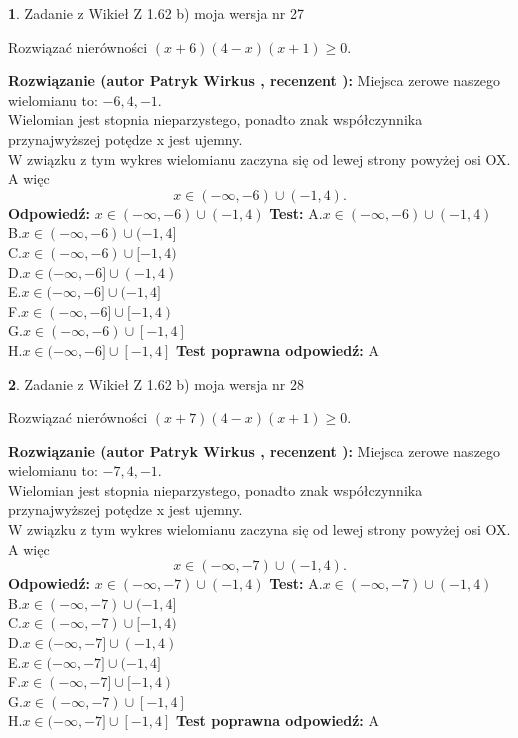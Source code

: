 \documentclass[12pt, a4paper]{article}
\theoremstyle{definition} %
\newtheorem{zad}{}
\newcommand{\zadStart}[1]{\begin{zad}#1\newline}
\newcommand{\zadStop}{\end{zad}}
\newcommand{\rozwStart}[2]{\noindent \textbf{Rozwiązanie (autor #1 , recenzent #2): }\newline}
\newcommand{\rozwStop}{\newline}
\newcommand{\odpStart}{\noindent \textbf{Odpowiedź:}\newline}
\newcommand{\odpStop}{\newline}
\newcommand{\testStart}{\noindent \textbf{Test:}\newline}
\newcommand{\testStop}{\newline}
\newcommand{\kluczStart}{\noindent \textbf{Test poprawna odpowiedź:}\newline}
\newcommand{\kluczStop}{\newline}
\begin{document}
\zadStart{Zadanie z Wikieł Z 1.62 b) moja wersja nr 27}

Rozwiązać nierówności $(x+6)(4-x)(x+1)\ge0$.
\zadStop
\rozwStart{Patryk Wirkus}{}
Miejsca zerowe naszego wielomianu to: $-6, 4, -1$.\\
Wielomian jest stopnia nieparzystego, ponadto znak współczynnika przy\linebreak najwyższej potędze x jest ujemny.\\ W związku z tym wykres wielomianu zaczyna się od lewej strony powyżej osi OX. A więc $$x \in (-\infty,-6) \cup (-1,4).$$
\rozwStop
\odpStart
$x \in (-\infty,-6) \cup (-1,4)$
\odpStop
\testStart
A.$x \in (-\infty,-6) \cup (-1,4)$\\
B.$x \in (-\infty,-6) \cup (-1,4]$\\
C.$x \in (-\infty,-6) \cup [-1,4)$\\
D.$x \in (-\infty,-6] \cup (-1,4)$\\
E.$x \in (-\infty,-6] \cup (-1,4]$\\
F.$x \in (-\infty,-6] \cup [-1,4)$\\
G.$x \in (-\infty,-6) \cup [-1,4]$\\
H.$x \in (-\infty,-6] \cup [-1,4]$
\testStop
\kluczStart
A
\kluczStop



\zadStart{Zadanie z Wikieł Z 1.62 b) moja wersja nr 28}

Rozwiązać nierówności $(x+7)(4-x)(x+1)\ge0$.
\zadStop
\rozwStart{Patryk Wirkus}{}
Miejsca zerowe naszego wielomianu to: $-7, 4, -1$.\\
Wielomian jest stopnia nieparzystego, ponadto znak współczynnika przy\linebreak najwyższej potędze x jest ujemny.\\ W związku z tym wykres wielomianu zaczyna się od lewej strony powyżej osi OX. A więc $$x \in (-\infty,-7) \cup (-1,4).$$
\rozwStop
\odpStart
$x \in (-\infty,-7) \cup (-1,4)$
\odpStop
\testStart
A.$x \in (-\infty,-7) \cup (-1,4)$\\
B.$x \in (-\infty,-7) \cup (-1,4]$\\
C.$x \in (-\infty,-7) \cup [-1,4)$\\
D.$x \in (-\infty,-7] \cup (-1,4)$\\
E.$x \in (-\infty,-7] \cup (-1,4]$\\
F.$x \in (-\infty,-7] \cup [-1,4)$\\
G.$x \in (-\infty,-7) \cup [-1,4]$\\
H.$x \in (-\infty,-7] \cup [-1,4]$
\testStop
\kluczStart
A
\kluczStop
\end{document}
